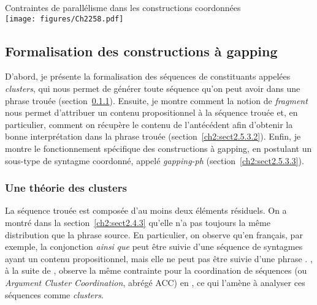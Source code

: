 \ea \label{ch2:ex258}
Contraintes de parallélisme dans les constructions coordonnées\\
\texttt{[image: figures/Ch2258.pdf]}


\z  


\subsection{Formalisation des constructions à gapping} \label{ch2:sect2.5.3}

D’abord, je présente la formalisation des séquences de constituants appelées \textit{clusters}, qui nous permet de générer toute séquence qu’on peut avoir dans une phrase trouée (section~\ref{ch2:sect2.5.3.1}). Ensuite, je montre comment la notion de \textit{fragment} nous permet d’attribuer un contenu propositionnel à la séquence trouée et, en particulier, comment on récupère le contenu de l’antécédent afin d’obtenir la bonne interprétation dans la phrase trouée (section~\ref{ch2:sect2.5.3.2}). Enfin, je montre le fonctionnement spécifique des constructions à gapping, en postulant un sous-type de syntagme coordonné, appelé \textit{gapping-ph} (section~\ref{ch2:sect2.5.3.3}).

\subsubsection{Une théorie des clusters} \label{ch2:sect2.5.3.1}

La séquence trouée est composée d’au moins deux éléments résiduels. On a montré dans la section~\ref{ch2:sect2.4.3} qu’elle n’a pas toujours la même distribution que la phrase source. En particulier, on observe qu’en français, par exemple, la conjonction \textit{ainsi} \textit{que} peut être suivie d’une séquence de syntagmes ayant un contenu propositionnel, mais elle ne peut pas être suivie d’une phrase . \citet{Mouret2006,Mouret2007}, à la suite de \citet{AbeilleEtAl1996}, observe la même contrainte pour la coordination de séquences (ou \textit{Argument Cluster Coordination}, abrégé ACC) en , ce qui l’amène à analyser ces séquences comme \textit{clusters}.

